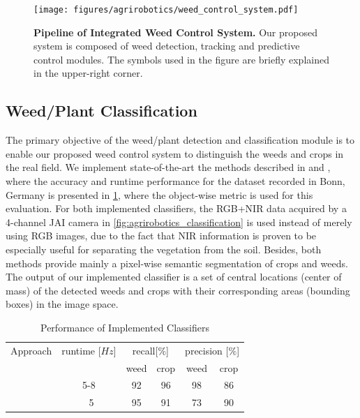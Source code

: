 \begin{figure}[t]
    \centering
    \texttt{[image: figures/agrirobotics/weed\_control\_system.pdf]}
    \caption[Pipeline of Integrated Weed Control System]{ \textbf{Pipeline of Integrated Weed Control System.} Our proposed system is composed of weed detection, tracking and predictive control modules. The symbols used in the figure are briefly explained in the upper-right corner. 
	\label{fig:agrirobotics_system}}
\end{figure}

\subsection{Weed/Plant Classification}

The primary objective of the weed/plant detection and classification module is to enable our proposed weed control system to distinguish the weeds and crops in the real field. 
We implement state-of-the-art the methods described in \cite{lottes2017semi} and \cite{lottes2018fully}, where the accuracy and runtime performance for the dataset recorded in Bonn, Germany is presented in \ref{tbl:agrirobotics_classificationperformance}, where the object-wise metric is used for this evaluation. 
For both implemented classifiers, the RGB+NIR data acquired by a 4-channel JAI camera in \ref{fig:agrirobotics_classification} is used instead of merely using RGB images, due to the fact that NIR information is proven to be especially useful for separating the vegetation from the soil. Besides, both methods provide mainly a pixel-wise semantic segmentation of crops and weeds. The output of our implemented classifier is a set of central locations (center of mass) of the detected weeds and crops with their corresponding areas (bounding boxes) in the image space. 

\begin{table}[t]
	\centering
	\caption[Performance of Implemented Classifiers]{ Performance of Implemented Classifiers \label{tbl:agrirobotics_classificationperformance}}
	\begin{tabular}{c|ccccc}
\hline
Approach              & runtime [$Hz$] & \multicolumn{2}{c}{recall[$\%$]} & \multicolumn{2}{c}{precision [$\%$]} \\
                      &                & weed            & crop           & weed              & crop             \\ \hline
\cite{lottes2017semi} & 5-8            & 92              & 96             & 98                & 86               \\
\cite{lottes2018fully} & ~5             & 95              & 91             & 73                & 90               \\ \hline
	\end{tabular}
\end{table}

